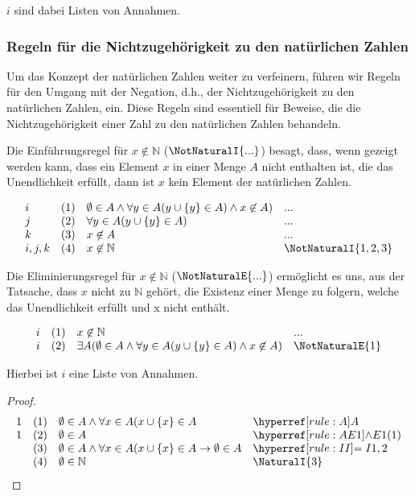 \documentclass[main.tex]{subfiles}
\begin{document}
\(i\) sind dabei Listen von Annahmen.

\subsubsection{Regeln für die Nichtzugehörigkeit zu den natürlichen Zahlen}
\label{rule:NotNaturalI} \label{rule:NotNaturalE}

Um das Konzept der natürlichen Zahlen weiter zu verfeinern, führen wir Regeln für den Umgang mit der Negation, d.h., der Nichtzugehörigkeit zu den natürlichen Zahlen, ein. Diese Regeln sind essentiell für Beweise, die die Nichtzugehörigkeit einer Zahl zu den natürlichen Zahlen behandeln.

Die Einführungsregel für \(x \not\in \mathbb{N}\) (\(\NotNaturalI{...}\)) besagt, dass, wenn gezeigt werden kann, dass ein Element \(x\) in einer Menge \(A\) nicht enthalten ist, die das Unendlichkeit erfüllt, dann ist \(x\) kein Element der natürlichen Zahlen.

\[
\begin{array}{llll}
	i & (1) & \emptyset\in A\land \forall y\in A(y\cup\{y\}\in A)\land x\not\in A) & ... \\
        j & (2) &  \forall y\in A(y\cup\{y\}\in A) & ... \\
        k & (3) &  x\not\in A & ... \\
	i,j,k & (4) & x \not\in \mathbb{N} & \NotNaturalI{1,2,3} \\
\end{array}
\]

Die Eliminierungsregel für \(x \not\in \mathbb{N}\) (\(\NotNaturalE{...}\)) ermöglicht es uns, aus der Tatsache, dass \(x\) nicht zu \(\mathbb{N}\) gehört, die Existenz einer Menge zu folgern, welche das Unendlichkeit erfüllt und x nicht enthält.

\[
\begin{array}{llll}
	i & (1) & x \not\in \mathbb{N} & ... \\
	i & (2) & \exists A(\emptyset\in A\land \forall y\in A(y\cup\{y\}\in A)\land x\not\in A) & \NotNaturalE{1} \\
\end{array}
\]

Hierbei ist \(i\) eine Liste von Annahmen.


\label{EmptysetInNatural}
\begin{theorem}
\end{theorem}
\begin{proof}
	\[
	\begin{array}{llll}
		1 & (1) & \emptyset\in A\land \forall x\in A(x\cup \{x\}\in A & \rA \\
		1 & (2) & \emptyset\in A & \rAEa{1} \\
		& (3) & \emptyset\in A\land \forall x\in A(x\cup \{x\}\in A\rightarrow \emptyset\in A & \rII{1,2} \\
		& (4) & \emptyset\in\mathbb{N} & \NaturalI{3} \\
	\end{array}
	\]
\end{proof}
\end{document}
